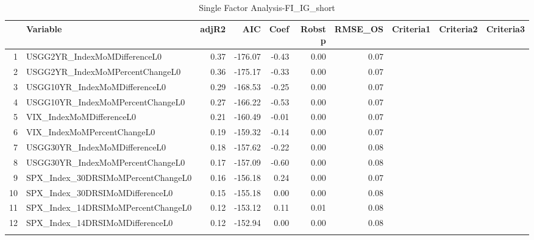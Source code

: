 \begin{longtable}{rlrrrrrlll}
  \hline
 & Variable & adjR2 & AIC & Coef & Robst p & RMSE\_OS & Criteria1 & Criteria2 & Criteria3 \\ 
  \hline
1 & USGG2YR\_IndexMoMDifferenceL0 & 0.37 & -176.07 & -0.43 & 0.00 & 0.07 &  &  &  \\ 
  2 & USGG2YR\_IndexMoMPercentChangeL0 & 0.36 & -175.17 & -0.33 & 0.00 & 0.07 &  &  &  \\ 
  3 & USGG10YR\_IndexMoMDifferenceL0 & 0.29 & -168.53 & -0.25 & 0.00 & 0.07 &  &  &  \\ 
  4 & USGG10YR\_IndexMoMPercentChangeL0 & 0.27 & -166.22 & -0.53 & 0.00 & 0.07 &  &  &  \\ 
  5 & VIX\_IndexMoMDifferenceL0 & 0.21 & -160.49 & -0.01 & 0.00 & 0.07 &  &  &  \\ 
  6 & VIX\_IndexMoMPercentChangeL0 & 0.19 & -159.32 & -0.14 & 0.00 & 0.07 &  &  &  \\ 
  7 & USGG30YR\_IndexMoMDifferenceL0 & 0.18 & -157.62 & -0.22 & 0.00 & 0.08 &  &  &  \\ 
  8 & USGG30YR\_IndexMoMPercentChangeL0 & 0.17 & -157.09 & -0.60 & 0.00 & 0.08 &  &  &  \\ 
  9 & SPX\_Index\_30DRSIMoMPercentChangeL0 & 0.16 & -156.18 & 0.24 & 0.00 & 0.07 &  &  &  \\ 
  10 & SPX\_Index\_30DRSIMoMDifferenceL0 & 0.15 & -155.18 & 0.00 & 0.00 & 0.08 &  &  &  \\ 
  11 & SPX\_Index\_14DRSIMoMPercentChangeL0 & 0.12 & -153.12 & 0.11 & 0.01 & 0.08 &  &  &  \\ 
  12 & SPX\_Index\_14DRSIMoMDifferenceL0 & 0.12 & -152.94 & 0.00 & 0.00 & 0.08 &  &  &  \\ 
   \hline
\hline
\caption{Single Factor Analysis-FI_IG_short} 
\end{longtable}
